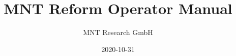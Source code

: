 \documentclass{book}
\title{MNT Reform Operator Manual}
\author{MNT Research GmbH}
\date{2020-10-31}
\begin{document}
\RaggedRight



\tableofcontents

\newpage
\end{document}
